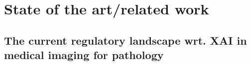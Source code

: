 \section{State of the art/related work}
\label{sec:related}





\subsection{The current regulatory landscape wrt. XAI in medical imaging for pathology }

